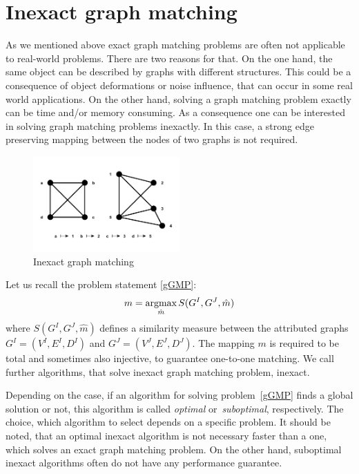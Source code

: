 \section{Inexact graph matching}
As we mentioned above exact graph matching problems are often not applicable to real-world problems. There are two reasons for that. %
On the one hand, the same object can be described by graphs with different structures. %
This could be a consequence of object deformations or noise influence, that can occur in some real world applications. On the other hand, solving a graph matching problem exactly can be time and/or memory consuming. As a consequence one can be interested in solving graph matching problems inexactly. In this case, a strong edge preserving mapping between the nodes of two graphs is not required.

\vspace{-12pt}
\begin{figure}[htb]
	\centering
	\includegraphics[width=0.5\textwidth]{chapter1/fig/inexactGM}
    \caption{Inexact graph matching}
    \label{fig:inexact_GM}
\end{figure}
\vspace{-10pt}
Let us recall the problem statement \eqref{gGMP}: 
\begin{equation*}
m = \mathop{\rm argmax}_{\hat{m}}S(G^I, G^J, \hat{m})
\end{equation*}
where $S(G^I, G^J, \hat{m})$ defines a similarity measure between the attributed graphs $G^I = (V^I, E^I,D^I)$ and $G^J = (V^J, E^J,D^J)$. The mapping $m$ is required to be total and sometimes also injective, to guarantee one-to-one matching. We call further algorithms, that solve inexact graph matching problem, inexact.

Depending on the case, if an algorithm for solving problem~\eqref{gGMP} finds a global solution or not, this algorithm is called \emph{optimal} or~\emph{suboptimal}, respectively. The choice, which algorithm to select depends on a specific problem. It should be noted, that an optimal inexact algorithm is not necessary faster than a one, which solves an exact graph matching problem. On the other hand, suboptimal inexact algorithms often do not have any performance guarantee.


